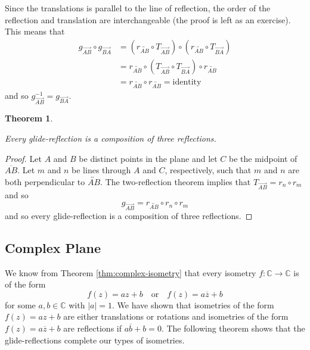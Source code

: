 \documentclass[
]{book}
\newtheorem{theorem}{Theorem}[chapter]
\theoremstyle{definition}
\theoremstyle{definition}
\theoremstyle{definition}
\theoremstyle{definition}
\theoremstyle{remark}
\begin{document}
Since the translations is parallel to the line of reflection, the order of the reflection and translation are interchangeable (the proof is left as an exercise). This means that
\begin{align*}
g_{\overrightarrow{AB}} \circ g_{\overrightarrow{BA}} & = \left( r_{\overleftrightarrow{AB}} \circ T_{\overrightarrow{AB}}\right) \circ \left( r_{\overleftrightarrow{AB}} \circ T_{\overrightarrow{BA}}\right) \\
& = r_{\overleftrightarrow{AB}} \circ \left( T_{\overrightarrow{AB}} \circ T_{\overrightarrow{BA}}\right) \circ  r_{\overleftrightarrow{AB}} \\
& =  r_{\overleftrightarrow{AB}} \circ r_{\overleftrightarrow{AB}} = \mbox{identity}
\end{align*}
and so \(g_{\overrightarrow{AB}}^{-1} = g_{\overrightarrow{BA}}\).

\begin{theorem}
\protect\hypertarget{thm:unlabeled-div-281}{}\label{thm:unlabeled-div-281}

Every glide-reflection is a composition of three reflections.

\end{theorem}

\begin{proof}

Let \(A\) and \(B\) be distinct points in the plane and let \(C\) be the midpoint of \(\overline{AB}\). Let \(m\) and \(n\) be lines through \(A\) and \(C\), respectively, such that \(m\) and \(n\) are both perpendicular to \(\overleftrightarrow{AB}\). The two-reflection theorem implies that \(T_{\overrightarrow{AB}}= r_n \circ r_m\) and so
\[g_{\overrightarrow{AB}}= r_{\overleftrightarrow{AB}} \circ r_n \circ r_m\] and so every glide-reflection is a composition of three reflections.

\end{proof}

\hypertarget{complex-plane-4}{%
\subsection{Complex Plane}\label{complex-plane-4}}

We know from Theorem \ref{thm:complex-isometry} that every isometry \(f:\mathbb{C}\rightarrow \mathbb{C}\) is of the form
\[f(z)=az+b \quad \mbox{or} \quad f(z)=a\overline{z}+b\] for some \(a,b\in \mathbb{C}\) with \(|a|=1\). We have shown that isometries of the form \(f(z)=az+b\) are either translations or rotations and isometries of the form \(f(z)=a\overline{z}+b\) are reflections if \(a\overline{b}+b=0\). The following theorem shows that the glide-reflections complete our types of isometries.
\end{document}
